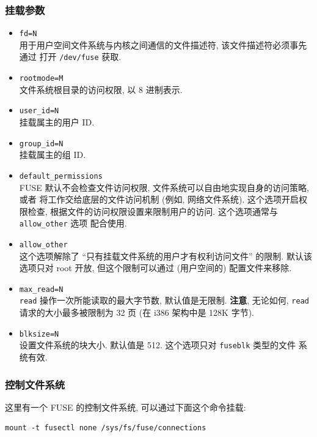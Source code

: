 \documentclass[nofonts, titlepage]{ctexart}
\begin{document}
\subsubsection{挂载参数}\label{ux6302ux8f7dux53c2ux6570}

\begin{itemize}
\item
  \texttt{fd=N}\\用于用户空间文件系统与内核之间通信的文件描述符,
  该文件描述符必须事先通过 打开 \texttt{/dev/fuse} 获取.
\item
  \texttt{rootmode=M}\\文件系统根目录的访问权限, 以 8 进制表示.
\item
  \texttt{user\_id=N}\\挂载属主的用户 ID.
\item
  \texttt{group\_id=N}\\挂载属主的组 ID.
\item
  \texttt{default\_permissions}\\FUSE 默认不会检查文件访问权限,
  文件系统可以自由地实现自身的访问策略, 或者
  将工作交给底层的文件访问机制 (例如, 网络文件系统).
  这个选项开启权限检查, 根据文件的访问权限设置来限制用户的访问.
  这个选项通常与 \texttt{allow\_other} 选项 配合使用.
\item
  \texttt{allow\_other}\\这个选项解除了
  ``只有挂载文件系统的用户才有权利访问文件'' 的限制. 默认该 选项只对
  root 开放, 但这个限制可以通过 (用户空间的) 配置文件来移除.
\item
  \texttt{max\_read=N}\\\texttt{read} 操作一次所能读取的最大字节数,
  默认值是无限制. \textbf{注意}, 无论如何, \texttt{read}
  请求的大小最多被限制为 32 页 (在 i386 架构中是 128K 字节).
\item
  \texttt{blksize=N}\\设置文件系统的块大小. 默认值是 512. 这个选项只对
  \texttt{fuseblk} 类型的文件 系统有效.
\end{itemize}

\subsubsection{控制文件系统}\label{ux63a7ux5236ux6587ux4ef6ux7cfbux7edf}

这里有一个 FUSE 的控制文件系统, 可以通过下面这个命令挂载:

\begin{verbatim}
mount -t fusectl none /sys/fs/fuse/connections
\end{verbatim}
\end{document}
